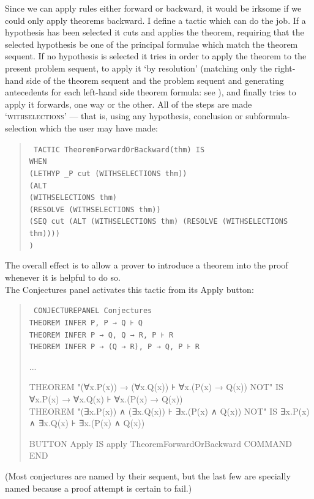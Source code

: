 Since we can apply rules either forward or backward, it would be irksome if we could only apply theorems backward. I define a tactic which can do the job. If a hypothesis has been selected it cuts and applies the theorem, requiring that the selected hypothesis be one of the principal formulae which match the theorem sequent. If no hypothesis is selected it tries in order to apply the theorem to the present problem sequent, to apply it `by resolution' (matching only the right-hand side of the theorem sequent and the problem sequent and generating antecedents for each left-hand side theorem formula: see ), and finally tries to apply it forwards, one way or the other. All of the steps are made `\textsc{withselections}' --- that is, using any hypothesis, conclusion or subformula-selection which the user may have made:
\begin{quote}\tt\small
TACTIC TheoremForwardOrBackward(thm) IS\\
\tab WHEN \\
\tab \tab (LETHYP \_P cut (WITHSELECTIONS thm))\\
\tab \tab (ALT \\
\tab \tab \tab (WITHSELECTIONS thm) \\
\tab \tab \tab (RESOLVE (WITHSELECTIONS thm)) \\
\tab \tab \tab (SEQ cut (ALT (WITHSELECTIONS thm) (RESOLVE (WITHSELECTIONS thm)))) \\
\tab \tab )
\end{quote}

The overall effect is to allow a prover to introduce a theorem into the proof whenever it is helpful to do so.\\
The Conjectures panel activates this tactic from its Apply button:
\begin{quote}\tt\small
CONJECTUREPANEL Conjectures\\
\tab THEOREM INFER P, P → Q ⊦ Q\\
\tab THEOREM INFER P → Q, Q → R, P ⊦ R\\
\tab THEOREM INFER P → (Q → R), P → Q, P ⊦ R

\tab ...

\tab THEOREM "(∀x.P(x)) → (∀x.Q(x)) ⊦ ∀x.(P(x) → Q(x)) NOT" IS ∀x.P(x) → ∀x.Q(x) ⊦ ∀x.(P(x) → Q(x))\\
\tab THEOREM "(∃x.P(x)) ∧ (∃x.Q(x)) ⊦ ∃x.(P(x) ∧ Q(x)) NOT" IS ∃x.P(x) ∧ ∃x.Q(x) ⊦ ∃x.(P(x) ∧ Q(x))

\tab BUTTON Apply IS apply TheoremForwardOrBackward COMMAND \\
END
\end{quote}
(Most conjectures are named by their sequent, but the last few are specially named because a proof attempt is certain to fail.)


